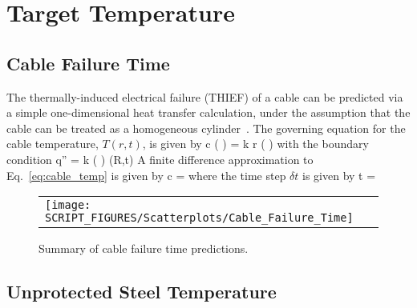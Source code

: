 
\chapter{Target Temperature}
\label{Target_Temperature_Chapter}

\clearpage

\section{Cable Failure Time}

The thermally-induced electrical failure (THIEF) of a cable can be predicted via a simple
one-dimensional heat transfer calculation, under the assumption that the cable can be
treated as a homogeneous cylinder~\cite{CAROLFIRE}. The governing equation for the cable temperature,
$T(r,t)$, is given by
\be
\rho c \left(  \right) =   k r \left(  \right)
\label{eq:cable_temp}
\ee
with the boundary condition
\be
\dot q'' = k \left(  \right) (R,t)
\ee
A finite difference approximation to Eq.~\ref{eq:cable_temp} is given by
\be
\rho c  =   
\ee
where the time step $\delta t$ is given by
\be
\delta t = 
\ee

\begin{figure}[!ht]
\begin{center}
\begin{tabular}{l}
\texttt{[image: SCRIPT\_FIGURES/Scatterplots/Cable\_Failure\_Time]}
\end{tabular}
\end{center}
\caption[Summary of cable failure time predictions]
{Summary of cable failure time predictions.}
\label{Surface_Temperature_THIEF_Summary}
\end{figure}

\clearpage


\section{Unprotected Steel Temperature}

